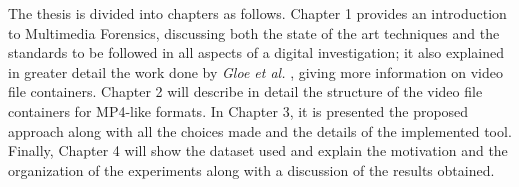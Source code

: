 The thesis is divided into chapters as follows. Chapter 1 provides an introduction to Multimedia Forensics, discussing both the state of the art techniques and the standards to be followed in all aspects of a digital investigation; it also explained in greater detail the work done by \emph{Gloe et al.} \cite{Gloe2014S68}, giving more information on video file containers. Chapter 2 will describe in detail the structure of the video file containers for MP4-like formats. In Chapter 3, it is presented the proposed approach along with all the choices made and the details of the implemented tool. Finally, Chapter 4 will show the dataset used and explain the motivation and the organization of the experiments along with a discussion of the results obtained.